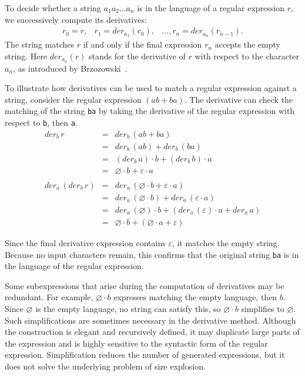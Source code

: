 \documentclass[12pt]{article}
\newcommand{\der}{\textit{der}}
\begin{document}
To decide whether a string $a_1 a_2 \dots a_n$ is in the language of a regular expression $r$, we successively 
compute its derivatives:
\[
\begin{array}{rcl}
r_0 = r,& r_1 = \der_{a_1}(r_0),& \dots, r_n = \der_{a_n}(r_{n-1}) .
\end{array}
\]
The string matches $r$ if and only if the final expression $r_n$ accepts the empty string. Here $\der_{a_n}(r)$ stands 
for the derivative of $r$ with respect to the character $a_n$, as introduced by Brzozowski~\cite{Brzozowski1964}.

To illustrate how derivatives can be used to match a regular expression against a string, consider the regular expression $( ab + ba )$. 
The derivative can check the matching of the string \texttt{ba} by taking the derivative of the regular expression with respect to \texttt{b},
then \texttt{a}.
\[
\begin{array}{rcl}
\der_b\, r           & =           &  \der_b\, (ab + ba) \\
                     & =           & \der_b\, (ab) + \der_b\, (ba) \\
                     & =           & (\der_b\, a) \cdot b + (\der_b\, b) \cdot a  \\
                     & =           & \varnothing \cdot b + \varepsilon \cdot a \\\\

\der_a\, (\der_b\, r) & =           & \der_a\, (\varnothing \cdot b + \varepsilon \cdot a)\\
                      & =           & \der_a\, (\varnothing \cdot b) + \der_a\, (\varepsilon \cdot a)\\
                      & =           & \der_a\, (\varnothing) \cdot b + (\der_a\, (\varepsilon) \cdot a + \der_a\, a)\\
                      & =           & \varnothing \cdot b + (\varnothing \cdot a + \varepsilon )
\end{array}
\]

Since the final derivative expression contains $\varepsilon$, it matches the empty string. Because no input characters 
remain, this confirms that the original string \texttt{ba} is in the language of the regular expression.

Some subexpressions that arise during the computation of derivatives may be redundant.  
For example, $\varnothing \cdot b$ expresses matching the empty language, then $b$.  
Since $\varnothing$ is the empty language, no string can satisfy this, so $\varnothing \cdot b$ simplifies to $\varnothing$.  
Such simplifications are sometimes necessary in the derivative method.  
Although the construction is elegant and recursively defined, it may duplicate large parts of the expression and is highly 
sensitive to the syntactic form of the regular expression. Simplification reduces the number of generated expressions, but 
it does not solve the underlying problem of size explosion.
\end{document}
